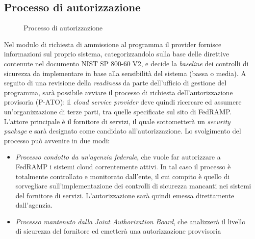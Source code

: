 \documentclass[../main.tex]{subfiles}
\begin{document}
\subsection {Processo di autorizzazione}
\begin{figure}[H]
\centering
{}
\caption{Processo di autorizzazione \cite{understandingFedRAMP} }\label{fig:fedramp_others}
\end{figure}


Nel modulo di richiesta di ammissione al programma il provider fornisce informazioni sul proprio sistema, categorizzandolo sulla base delle direttive contenute nel documento NIST SP 800-60 V2\cite{nist80060}, e decide la \textit{baseline} dei controlli di sicurezza da implementare in base alla sensibilità del sistema (bassa o media).
A seguito di una revisione della \textit{readiness} da parte dell'ufficio di gestione del programma, sarà possibile avviare il processo di richiesta dell'autorizzazione provisoria (P-ATO): il \textit{cloud service provider} deve quindi ricercare ed assumere un'organizzazione di terze parti, tra quelle specificate sul sito di FedRAMP.
L'attore principale è il fornitore di servizi, il quale sottometterà un \textit{security package} e sarà designato come candidato all'autorizzazione. Lo svolgimento del processo può avvenire in due modi:
\begin{itemize}
    \item \textit{Processo condotto da un'agenzia federale}, che vuole far autorizzare a FedRAMP i sistemi cloud correntemente attivi. In tal caso il processo è totalmente controllato e monitorato dall'ente, il cui compito è quello di sorvegliare sull'implementazione dei controlli di sicurezza mancanti nei sistemi del fornitore di servizi. L'autorizzazione sarà quindi emessa direttamente dall'agenzia.
    \item \textit{Processo mantenuto dalla Joint Authorization Board}, che analizzerà il livello di sicurezza del fornitore ed emetterà una autorizzazione provvisoria
\end{itemize}
\end{document}
